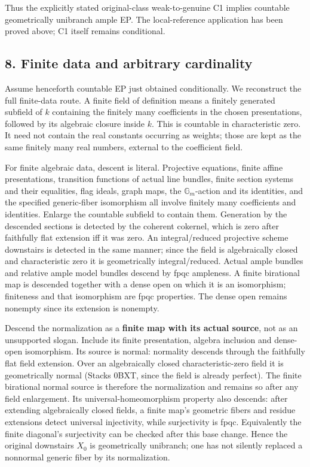 \documentclass[
  10pt,
]{article}
\begin{document}
Thus the explicitly stated original-class weak-to-genuine C1 implies
countable geometrically unibranch ample EP. The local-reference
application has been proved above; C1 itself remains conditional.

\subsection{8. Finite data and arbitrary
cardinality}\label{finite-data-and-arbitrary-cardinality}

Assume henceforth countable EP just obtained conditionally. We
reconstruct the full finite-data route. A finite field of definition
means a finitely generated subfield of \(k\) containing the finitely
many coefficients in the chosen presentations, followed by its algebraic
closure inside \(k\). This is countable in characteristic zero. It need
not contain the real constants occurring as weights; those are kept as
the same finitely many real numbers, external to the coefficient field.

For finite algebraic data, descent is literal. Projective equations,
finite affine presentations, transition functions of actual line
bundles, finite section systems and their equalities, flag ideals, graph
maps, the \(\mathbb G_m\)-action and its identities, and the specified
generic-fiber isomorphism all involve finitely many coefficients and
identities. Enlarge the countable subfield to contain them. Generation
by the descended sections is detected by the coherent cokernel, which is
zero after faithfully flat extension iff it was zero. An
integral/reduced projective scheme downstairs is detected in the same
manner; since the field is algebraically closed and characteristic zero
it is geometrically integral/reduced. Actual ample bundles and relative
ample model bundles descend by fpqc ampleness. A finite birational map
is descended together with a dense open on which it is an isomorphism;
finiteness and that isomorphism are fpqc properties. The dense open
remains nonempty since its extension is nonempty.

Descend the normalization as a \textbf{finite map with its actual
source}, not as an unsupported slogan. Include its finite presentation,
algebra inclusion and dense-open isomorphism. Its source is normal:
normality descends through the faithfully flat field extension. Over an
algebraically closed characteristic-zero field it is geometrically
normal (Stacks 0BXT, since the field is already perfect). The finite
birational normal source is therefore the normalization and remains so
after any field enlargement. Its universal-homeomorphism property also
descends: after extending algebraically closed fields, a finite map's
geometric fibers and residue extensions detect universal injectivity,
while surjectivity is fpqc. Equivalently the finite diagonal's
surjectivity can be checked after this base change. Hence the original
downstairs \(X_0\) is geometrically unibranch; one has not silently
replaced a nonnormal generic fiber by its normalization.
\end{document}
